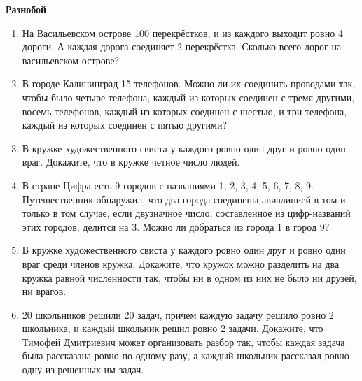 \documentclass{article}
\begin{document}
\large
	
\begin{center}
	\textbf{Разнобой}
\end{center}


\begin{enumerate}[label*=\protect\fbox{\arabic{enumi}}]

\item На Васильевском острове 100 перекрёстков, и из каждого выходит ровно 4 дороги. А каждая дорога соединяет 2 перекрёстка. Сколько всего дорог на васильевском острове?

\item В городе Калининград 15 телефонов. Можно ли их соединить проводами так, чтобы было четыре телефона, каждый из которых соединен с тремя другими, восемь телефонов, каждый из которых соединен с шестью, и три телефона, каждый из которых соединен с пятью другими?

\item В кружке художественного свиста у каждого ровно один друг и ровно один враг. Докажите, что в кружке четное число людей.

\item В стране Цифра есть 9 городов с названиями 1, 2, 3, 4, 5, 6, 7, 8, 9. Путешественник обнаружил, что два города соединены авиалинией в том и только в том случае, если двузначное число, составленное из цифр-названий этих городов, делится на 3. Можно ли добраться из города 1 в город 9?

\item В кружке художественного свиста у каждого ровно один друг и ровно один враг среди членов кружка.
Докажите, что кружок можно разделить на два кружка равной численности так, чтобы ни в одном из них не было ни друзей, ни врагов.

\item 20 школьников решили 20 задач, причем каждую задачу решило ровно 2 школьника, и каждый школьник решил ровно 2 задачи. Докажите, что Тимофей Дмитриевич может организовать разбор так, чтобы каждая задача была рассказана ровно по одному разу, а каждый школьник рассказал ровно одну из решенных им задач.

\end{enumerate}
\end{document}
